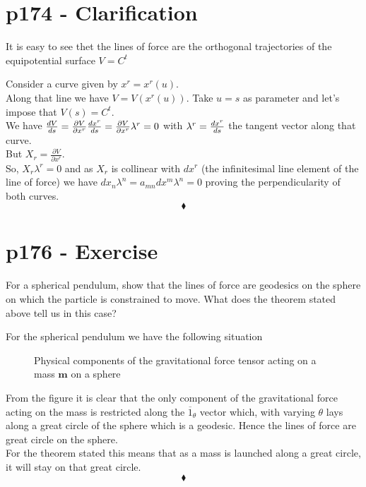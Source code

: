 \section{p174 - Clarification}
\begin{tcolorbox}
It is easy to see thet the lines of force are the orthogonal trajectories of the equipotential surface $V=C^{t}$
\end{tcolorbox}
Consider a curve given by $x^r=x^r\left(u\right)$. \\Along that line we have $V= V\left(x^r\left(u\right)\right)$. Take $u=s$ as parameter and let's impose that $V\left(s\right)= C^{t}$.\\ We have
$\dv{V}{s} = \frac{\partial{V}}{\partial{x^r}}\dv{x^r}{s} =\frac{\partial{V}}{\partial{x^r}}\lambda^r =0$ with $\lambda^r=\dv{x^r}{s}$ the tangent vector along that curve.\\ But $X_r = \frac{\partial{V}}{\partial{x^r}}$. \\
So, $X_r\lambda^r=0$ and as $X_r$ is collinear with $dx^r$ (the infinitesimal line element of the line of force) we have $dx_n \lambda^n = a_{mn}dx^m \lambda^n=0$ proving the perpendicularity of both curves.
$$\blacklozenge$$
\newpage

\section{p176 - Exercise}
\begin{tcolorbox}
For a spherical pendulum, show that the lines of force are geodesics on the sphere on which the particle is constrained to move. What does the theorem stated above tell us in this case?
\end{tcolorbox}
For the spherical pendulum we have the following situation
\begin{figure}[H]

\caption{Physical components of the gravitational force tensor acting on a mass $\mathbf{m}$ on a sphere }
\label{fig:fig_p176_Ex1}
\end{figure}
From the figure it is clear that the only component of the gravitational force acting on the mass is restricted along the $\overline{1}_{\theta}$ vector which, with varying $\theta$ lays along a great circle of the sphere which is a geodesic. Hence the lines of force are great circle on the sphere. \\
For the theorem stated this means that as a mass is launched along a great circle, it will stay on that great circle.
$$\blacklozenge$$
\newpage



